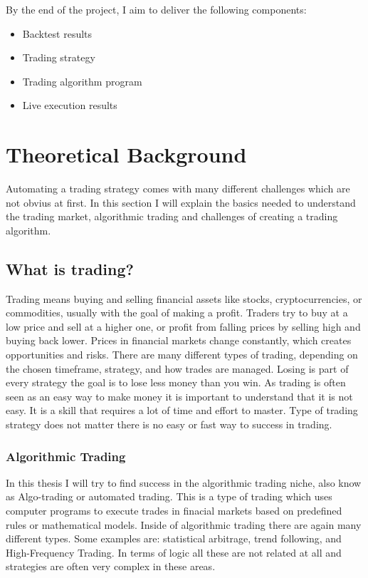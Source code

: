 \documentclass[12pt]{article}
\begin{document}
By the end of the project, I aim to deliver the following components:

\begin{itemize}
    \item Backtest results
    \item Trading strategy
    \item Trading algorithm program
    \item Live execution results
\end{itemize}




\newpage

\section{Theoretical Background}
Automating a trading strategy comes with many different challenges which are not obvius at first. In this section I will explain the basics needed to understand the trading market, algorithmic trading and challenges of creating a trading algorithm.







\subsection{What is trading?}
Trading means buying and selling financial assets like stocks, cryptocurrencies, or commodities, usually with the goal of making a profit. Traders try to buy at a low price and sell at a higher one, or profit from falling prices by selling high and buying back lower. Prices in financial markets change constantly, which creates opportunities and risks. There are many different types of trading, depending on the chosen timeframe, strategy, and how trades are managed. Losing is part of every strategy the goal is to lose less money than you win.
As trading is often seen as an easy way to make money it is important to understand that it is not easy. It is a skill that requires a lot of time and effort to master. Type of trading strategy does not matter there is no easy or fast way to success in trading. 

\subsubsection*{Algorithmic Trading}
In this thesis I will try to find success in the algorithmic trading niche, also know as Algo-trading or automated trading. This is a type of trading which uses computer programs to execute trades in finacial markets based on predefined rules or mathematical models.  Inside of algorithmic trading there are again many different types. Some examples are: statistical arbitrage, trend following, and High-Frequency Trading. In terms of logic all these are not related at all and strategies are often very complex in these areas. 
\end{document}
